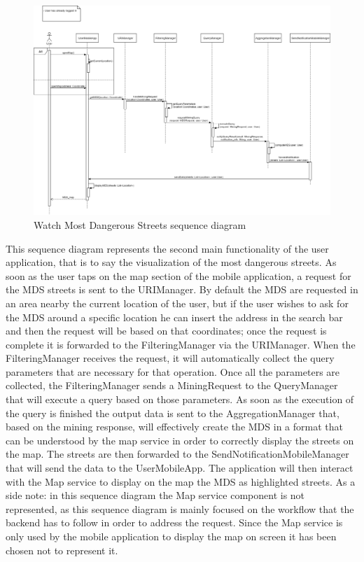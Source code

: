 \begin{figure}[H]
  \centering
  \includegraphics[width=1\textwidth]{Images/UML_diagrams/Sequence_Diagrams/Request_MDS_sd.png}
  \caption{Watch Most Dangerous Streets sequence diagram}
  \label{fig:watch_MDS_sd}
\end{figure}
This sequence diagram represents the second main functionality of the user application, that is to say the visualization of the most dangerous streets. As soon as the user taps on the map section of the mobile application, a request for the MDS streets is sent to the URIManager. By default the MDS are requested in an area nearby the current location of the user, but if the user wishes to ask for the MDS around a specific location he can insert the address in the search bar and then the request will be based on that coordinates; once the request is complete it is forwarded to the FilteringManager via the URIManager. When the FilteringManager receives the request, it will automatically collect the query parameters that are necessary for that operation.  Once all the parameters are collected, the FilteringManager sends a MiningRequest to the QueryManager that will execute a query based on those parameters. As soon as the execution of the query is finished the output data is sent to the AggregationManager that, based on the mining response, will effectively create the MDS in a format that can be understood by the map service in order to correctly display the streets on the map. The streets are then forwarded to the SendNotificationMobileManager that will send the data to the UserMobileApp. The application will then interact with the Map service to display on the map the MDS as highlighted streets. As a side note: in this sequence diagram the Map service component is not represented, as this sequence diagram is mainly focused on the workflow that the backend has to follow in order to address the request. Since the Map service is only used by the mobile application to display the map on screen it has been chosen not to represent it.
